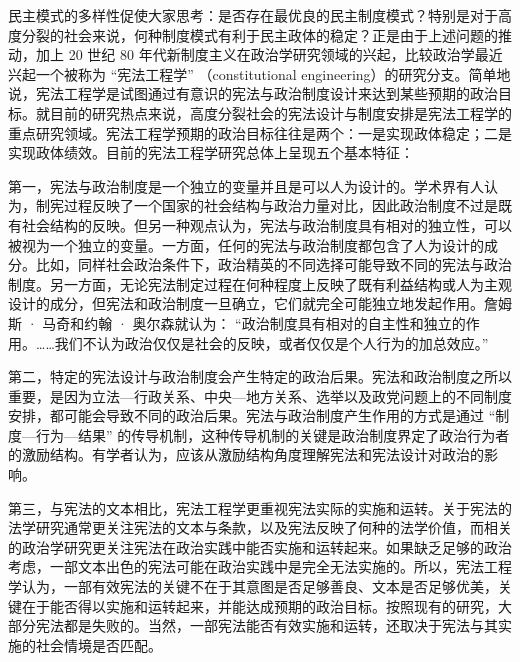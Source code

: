 民主模式的多样性促使大家思考：是否存在最优良的民主制度模式？特别是对于高度分裂的社会来说，何种制度模式有利于民主政体的稳定？正是由于上述问题的推动，加上 20 世纪 80 年代新制度主义在政治学研究领域的兴起，比较政治学最近兴起一个被称为 “宪法工程学” （constitutional engineering）的研究分支。简单地说，宪法工程学是试图通过有意识的宪法与政治制度设计来达到某些预期的政治目标。就目前的研究热点来说，高度分裂社会的宪法设计与制度安排是宪法工程学的重点研究领域。宪法工程学预期的政治目标往往是两个：一是实现政体稳定；二是实现政体绩效。目前的宪法工程学研究总体上呈现五个基本特征：

第一，宪法与政治制度是一个独立的变量并且是可以人为设计的。学术界有人认为，制宪过程反映了一个国家的社会结构与政治力量对比，因此政治制度不过是既有社会结构的反映。但另一种观点认为，宪法与政治制度具有相对的独立性，可以被视为一个独立的变量。一方面，任何的宪法与政治制度都包含了人为设计的成分。比如，同样社会政治条件下，政治精英的不同选择可能导致不同的宪法与政治制度。另一方面，无论宪法制定过程在何种程度上反映了既有利益结构或人为主观设计的成分，但宪法和政治制度一旦确立，它们就完全可能独立地发起作用。詹姆斯 · 马奇和约翰 · 奥尔森就认为： “政治制度具有相对的自主性和独立的作用。……我们不认为政治仅仅是社会的反映，或者仅仅是个人行为的加总效应。” 

第二，特定的宪法设计与政治制度会产生特定的政治后果。宪法和政治制度之所以重要，是因为立法—行政关系、中央—地方关系、选举以及政党问题上的不同制度安排，都可能会导致不同的政治后果。宪法与政治制度产生作用的方式是通过 “制度—行为—结果” 的传导机制，这种传导机制的关键是政治制度界定了政治行为者的激励结构。有学者认为，应该从激励结构角度理解宪法和宪法设计对政治的影响。

第三，与宪法的文本相比，宪法工程学更重视宪法实际的实施和运转。关于宪法的法学研究通常更关注宪法的文本与条款，以及宪法反映了何种的法学价值，而相关的政治学研究更关注宪法在政治实践中能否实施和运转起来。如果缺乏足够的政治考虑，一部文本出色的宪法可能在政治实践中是完全无法实施的。所以，宪法工程学认为，一部有效宪法的关键不在于其意图是否足够善良、文本是否足够优美，关键在于能否得以实施和运转起来，并能达成预期的政治目标。按照现有的研究，大部分宪法都是失败的。当然，一部宪法能否有效实施和运转，还取决于宪法与其实施的社会情境是否匹配。

